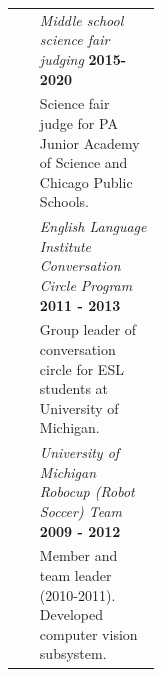 \documentclass{article}
\begin{document}
\begin{longtable}{@{}>{\raggedleft}p{0.17\linewidth}
     p{}@{}}
  & \textit{Middle school science fair judging}
    \hfill\textbf{2015-2020}\\
  & Science fair judge for PA Junior Academy of Science and Chicago Public Schools.\\[0.5em]
  & \textit{English Language Institute Conversation Circle Program}
    \hfill\textbf{2011 - 2013}\\
  & Group leader of conversation circle for ESL students at University of Michigan.\\[0.5em]
  & \textit{University of Michigan Robocup (Robot Soccer) Team}
    \hfill\textbf{2009 - 2012}\\
  & Member and team leader (2010-2011). Developed computer vision subsystem.\\[0.0em]
\end{longtable}
\end{document}
